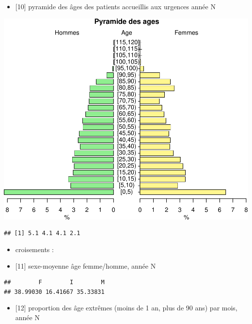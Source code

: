 \documentclass[]{article}
\begin{document}
\begin{itemize}
\itemsep1pt\parskip0pt
\item
  {[}10{]} pyramide des âges des patients accueillis aux urgences année
  N
\end{itemize}

\includegraphics{rapport_2014_files/figure-latex/pyramide-1.pdf}

\begin{verbatim}
## [1] 5.1 4.1 4.1 2.1
\end{verbatim}

\begin{itemize}
\item
  croisements :
\item
  {[}11{]} sexe-moyenne âge femme/homme, année N
\end{itemize}

\begin{verbatim}
##        F        I        M 
## 38.99030 16.41667 35.33831
\end{verbatim}

\begin{itemize}
\itemsep1pt\parskip0pt
\item
  {[}12{]} proportion des âge extrêmes (moins de 1 an, plus de 90 ans)
  par mois, année N
\end{itemize}
\end{document}
